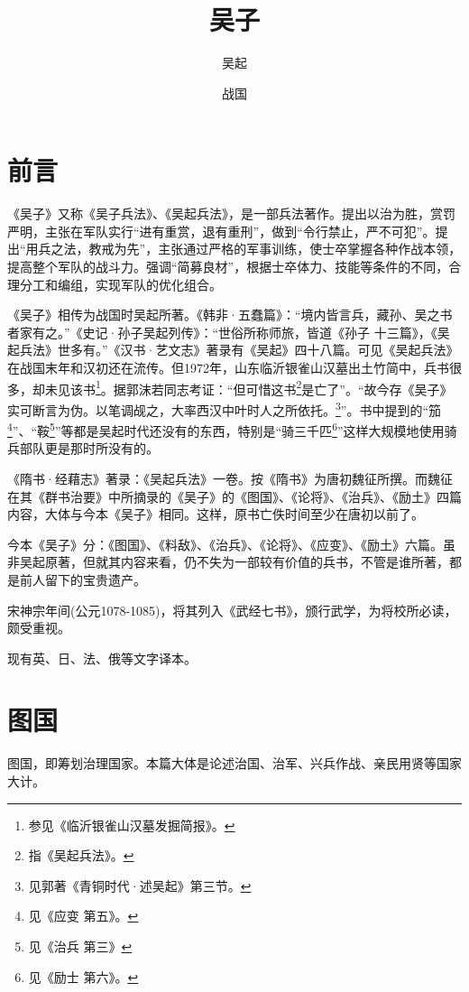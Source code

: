 \documentclass[a4paper,12pt,UTF8,twoside]{ctexbook}
\title{\heiti\zihao{0} 吴子}
\author{吴起}
\date{战国}
\begin{document}
\maketitle
\tableofcontents

\frontmatter
\chapter{前言}

《吴子》又称《吴子兵法》、《吴起兵法》，是一部兵法著作。提出以治为胜，赏罚严明，主张在军队实行“进有重赏，退有重刑”，做到“令行禁止，严不可犯”。提出“用兵之法，教戒为先”，主张通过严格的军事训练，使士卒掌握各种作战本领，提高整个军队的战斗力。强调“简募良材”，根据士卒体力、技能等条件的不同，合理分工和编组，实现军队的优化组合。

《吴子》相传为战国时吴起所著。《韩非·五蠢篇》：“境内皆言兵，藏孙、吴之书者家有之。”《史记·孙子吴起列传》：“世俗所称师旅，皆道《孙子 十三篇》，《吴起兵法》世多有。”《汉书·艺文志》著录有《吴起》四十八篇。可见《吴起兵法》在战国末年和汉初还在流传。但1972年，山东临沂银雀山汉墓出土竹简中，兵书很多，却未见该书\footnote{参见《临沂银雀山汉墓发掘简报》。}。据郭沫若同志考证：“但可惜这书\footnote{指《吴起兵法》。}是亡了”。“故今存《吴子》实可断言为伪。以笔调觇之，大率西汉中叶时人之所依托。\footnote{见郭著《青铜时代·述吴起》第三节。}”。书中提到的“笳\footnote{见《应变 第五》。}”、“鞍\footnote{见《治兵 第三》}”等都是吴起时代还没有的东西，特别是“骑三千匹\footnote{见《励士 第六》。}”这样大规模地使用骑兵部队更是那时所没有的。

《隋书·经藉志》著录：《吴起兵法》一卷。按《隋书》为唐初魏征所撰。而魏征在其《群书治要》中所摘录的《吴子》的《图国》、《论将》、《治兵》、《励土》四篇内容，大体与今本《吴子》相同。这样，原书亡佚时间至少在唐初以前了。

今本《吴子》分：《图国》、《料敌》、《治兵》、《论将》、《应变》、《励土》六篇。虽非吴起原著，但就其内容来看，仍不失为一部较有价值的兵书，不管是谁所著，都是前人留下的宝贵遗产。

宋神宗年间(公元1078-1085)，将其列入《武经七书》，颁行武学，为将校所必读，颇受重视。

现有英、日、法、俄等文字译本。

\mainmatter

\chapter{图国}

图国，即筹划治理国家。本篇大体是论述治国、治军、兴兵作战、亲民用贤等国家大计。
\end{document}
